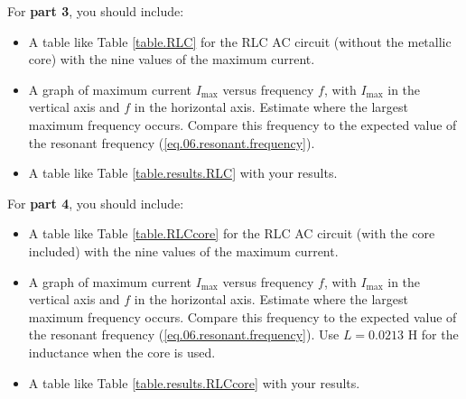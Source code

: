 For \textbf{part 3}, you should include:
\begin{itemize}
	\item A table like Table \ref{table.RLC} for the RLC AC circuit (without the metallic core) with the nine values of the maximum current.
	\item A graph of maximum current $I_{\text{max}}$ versus frequency $f$, with $I_{\text{max}}$ in the vertical axis and $f$ in the horizontal axis. Estimate where the largest maximum frequency occurs. Compare this frequency to the expected value of the resonant frequency (\ref{eq.06.resonant.frequency}).
	\item A table like Table \ref{table.results.RLC} with your results.
\end{itemize}
For \textbf{part 4}, you should include:
\begin{itemize}
	\item A table like Table \ref{table.RLCcore} for the RLC AC circuit (with the core included) with the nine values of the maximum current.
	\item A graph of maximum current $I_{\text{max}}$ versus frequency $f$, with $I_{\text{max}}$ in the vertical axis and $f$ in the horizontal axis. Estimate where the largest maximum frequency occurs. Compare this frequency to the expected value of the resonant frequency (\ref{eq.06.resonant.frequency}). Use $L = 0.0213$ H for the inductance when the core is used.
	\item A table like Table \ref{table.results.RLCcore} with your results.
\end{itemize}
\pagebreak
